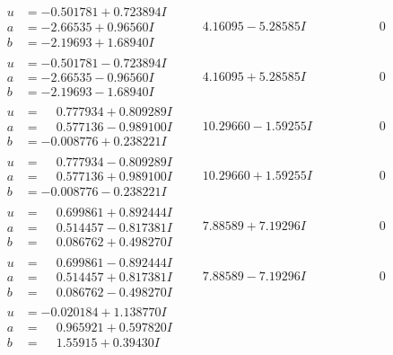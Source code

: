 \documentclass[1p]{elsarticle_modified}
\theoremstyle{definition}
\begin{document}
$$\begin{array}{c|c|c}
\begin{aligned}
u &= -0.501781 + 0.723894 I \\
a &= -2.66535 + 0.96560 I \\
b &= -2.19693 + 1.68940 I\end{aligned}
 & \phantom{-}4.16095 - 5.28585 I & \phantom{-0.000000 } 0 \\ \hline\begin{aligned}
u &= -0.501781 - 0.723894 I \\
a &= -2.66535 - 0.96560 I \\
b &= -2.19693 - 1.68940 I\end{aligned}
 & \phantom{-}4.16095 + 5.28585 I & \phantom{-0.000000 } 0 \\ \hline\begin{aligned}
u &= \phantom{-}0.777934 + 0.809289 I \\
a &= \phantom{-}0.577136 - 0.989100 I \\
b &= -0.008776 + 0.238221 I\end{aligned}
 & \phantom{-}10.29660 - 1.59255 I & \phantom{-0.000000 } 0 \\ \hline\begin{aligned}
u &= \phantom{-}0.777934 - 0.809289 I \\
a &= \phantom{-}0.577136 + 0.989100 I \\
b &= -0.008776 - 0.238221 I\end{aligned}
 & \phantom{-}10.29660 + 1.59255 I & \phantom{-0.000000 } 0 \\ \hline\begin{aligned}
u &= \phantom{-}0.699861 + 0.892444 I \\
a &= \phantom{-}0.514457 - 0.817381 I \\
b &= \phantom{-}0.086762 + 0.498270 I\end{aligned}
 & \phantom{-}7.88589 + 7.19296 I & \phantom{-0.000000 } 0 \\ \hline\begin{aligned}
u &= \phantom{-}0.699861 - 0.892444 I \\
a &= \phantom{-}0.514457 + 0.817381 I \\
b &= \phantom{-}0.086762 - 0.498270 I\end{aligned}
 & \phantom{-}7.88589 - 7.19296 I & \phantom{-0.000000 } 0 \\ \hline\begin{aligned}
u &= -0.020184 + 1.138770 I \\
a &= \phantom{-}0.965921 + 0.597820 I \\
b &= \phantom{-}1.55915 + 0.39430 I\end{aligned}

\end{array}$$
\end{document}
